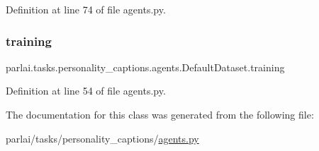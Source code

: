Definition at line 74 of file agents.\+py.

\mbox{\label{classparlai_1_1tasks_1_1personality__captions_1_1agents_1_1DefaultDataset_a859342ffaf7f760cda952bc662cd7da3}} 
\subsubsection{\texorpdfstring{training}{training}}
{\footnotesize\ttfamily parlai.\+tasks.\+personality\+\_\+captions.\+agents.\+Default\+Dataset.\+training}



Definition at line 54 of file agents.\+py.



The documentation for this class was generated from the following file\+:\begin{DoxyCompactItemize}
\item 
parlai/tasks/personality\+\_\+captions/\hyperlink{parlai_2tasks_2personality__captions_2agents_8py}{agents.\+py}\end{DoxyCompactItemize}
